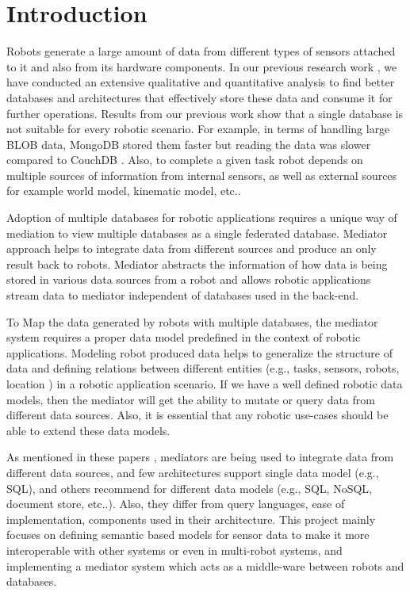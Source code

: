 

    \chapter{Introduction}

Robots generate a large amount of data from different types of sensors attached to it and also from its hardware components. In our previous research work \cite{ravichandranworkbench}, we have conducted an extensive qualitative and quantitative analysis to find better databases and architectures that effectively store these data and consume it for further operations. Results from our previous work show that a single database is not suitable for every robotic scenario. For example, in terms of handling large BLOB data, MongoDB stored them faster but reading the data was slower compared to CouchDB \cite{ravichandranworkbench}. Also, to complete a given task robot depends on multiple sources of information from internal sensors, as well as external sources for example world model, kinematic model, etc.. 

Adoption of multiple databases for robotic applications requires a unique way of mediation to view multiple databases as a single federated database. Mediator approach helps to integrate data from different sources and produce an only result back to robots. Mediator abstracts the information of how data is being stored in various data sources from a robot and allows robotic applications stream data to mediator independent of databases used in the back-end.

To Map the data generated by robots with multiple databases, the mediator system requires a proper data model predefined in the context of robotic applications. Modeling robot produced data helps to generalize the structure of data and defining relations between different entities (e.g., tasks,  sensors, robots, location ) in a robotic application scenario. If we have a well defined robotic data models, then the mediator will get the ability to mutate or query data from different data sources. Also, it is essential that any robotic use-cases should be able to extend these data models.


As mentioned in these papers \cite{ahmed1991pegasus,fahl1993amos,arens1996query,chawathe1994tsimmis,chawathe1994tsimmis,shoens1993rufus}, mediators are being used to integrate data from different data sources, and few architectures support single data model (e.g., SQL), and others recommend for different data models (e.g., SQL, NoSQL, document store, etc..). Also, they differ from query languages, ease of implementation, components used in their architecture. This project mainly focuses on defining semantic based models for sensor data to make it more interoperable with other systems or even in multi-robot systems, and implementing a mediator system which acts as a middle-ware between robots and databases. 

